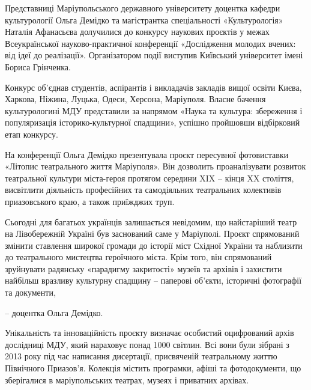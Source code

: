  
 
 
 
 

Представниці Маріупольського державного університету доцентка кафедри
культурології Ольга Демідко та магістрантка спеціальності «Культурологія»
Наталія Афанасьєва долучилися до конкурсу наукових проєктів у межах
Всеукраїнської науково-практичної конференції «Дослідження молодих вчених: від
ідеї до реалізації». Організатором події виступив Київський університет імені
Бориса Грінченка.

Конкурс об'єднав студентів, аспірантів і викладачів закладів вищої освіти
Києва, Харкова, Ніжина, Луцька, Одеси, Херсона, Маріуполя. Власне бачення
культурологині МДУ представили за напрямом «Наука та культура: збереження і
популяризація історико-культурної спадщини», успішно пройшовши відбірковий етап
конкурсу.

На конференції Ольга Демідко презентувала проєкт пересувної фотовиставки
«Літопис театрального життя Маріуполя». Він дозволить проаналізувати розвиток
театральної культури міста-героя протягом середини XIX – кінця XX століття,
висвітлити діяльність професійних та самодіяльних театральних колективів
приазовського краю, а також приїжджих труп.

Сьогодні для багатьох українців залишається невідомим, що найстаріший театр
на Лівобережній Україні був заснований саме у Маріуполі. Проєкт спрямований
змінити ставлення широкої громади до історії міст Східної України та
наблизити до театрального мистецтва героїчного міста. Крім того, він
спрямований зруйнувати радянську «парадигму закритості» музеїв та архівів і
захистити найбільш вразливу культурну спадщину – паперові об’єкти,
історичні фотографії та документи,

– доцентка Ольга Демідко.

Унікальність та інноваційність проєкту визначає особистий оцифрований архів
дослідниці МДУ, який нараховує понад 1000 світлин. Всі вони були зібрані з 2013
року під час написання дисертації, присвяченій театральному життю Північного
Приазов'я. Колекція містить програмки, афіші та фотодокументи, що зберігалися в
маріупольських театрах, музеях і приватних архівах. 

